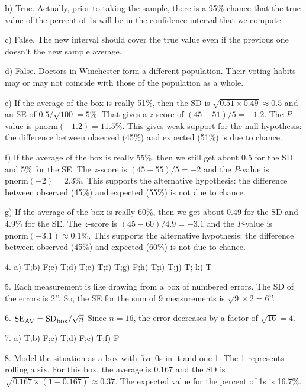 \documentclass[10pt]{article}
\newcommand{\Z}{\hphantom{0}}
\begin{document}
b) True. Actually, prior to taking the sample, there is a 95\% chance that the 
true value of the percent of 1s will be in the confidence interval that we compute.

c) False.  The new interval should cover the true value even if the previous one doesn't
the new sample average.

d) False.  Doctors in Winchester form a different population.  Their voting habits may or may not
coincide with those of the population as a whole.

e) If the average of the box is really 51\%, then the SD is $\sqrt{0.51\times 0.49}\approx 0.5$
and an SE of $0.5/\sqrt{100} = 5\%$.
That gives a $z$-score of $(45 - 51)/5 = -1.2$.  The $P$-value is $\mbox{pnorm}(-1.2)=11.5\%$.  This gives
weak support for the null hypothesis:  the difference between observed (45\%) and expected (51\%) is 
due to chance.

f) If the average of the box is really 55\%, then we still get about $0.5$ for the SD and 5\% for the SE.
The $z$-score is $(45-55)/5=-2$ and the $P$-value is $\mbox{pnorm}(-2)=2.3\%$.  This supports
the alternative hypothesis:  the difference between observed (45\%) and expected (55\%) is 
not due to chance.

g) If the average of the box is really 60\%, then we  get about $0.49$ for the SD and 4.9\% for the SE.
The $z$-score is $(45-60)/4.9=-3.1$ and the $P$-value is $\mbox{pnorm}(-3.1)\approx 0.1\%$.  This supports
the alternative hypothesis:  the difference between observed (45\%) and expected (60\%) is 
not due to chance.
\smallskip

\renewcommand{\Z}{\hspace{10pt}}
4. a) T;\Z b) F;\Z c) T;\Z d) T;\Z e) T;\Z f) T;\Z g) F;\Z h) T;\Z i) T;\Z j) T;\Z
k) T
\smallskip

5. Each measurement is like drawing from a box of numbered errors.  The SD of the errors is 2\rq\rq.
So, the SE for the sum of 9 measurements is $\sqrt{9}\times 2 = 6$\rq\rq.\vspace{2pt}


6. $\mbox{SE}_{\mbox{\footnotesize AV}} = \mbox{SD}_{\mbox{\footnotesize box}}/\sqrt{n}$  Since $n=16$, the 
error decreases by a factor of $\sqrt{16}=4$.\vspace{2pt}

7. a) T;\Z b)  F;\Z c) T;\Z d) F;\Z e) T;\Z f) F\vspace{2pt}

8. Model the situation as a box with five 0s in it and one 1. The 1 represents rolling a six.
For this box, the average is $0.167$ and the SD is $\sqrt{0.167\times (1- 0.167)}\approx 0.37$.
The expected value for the percent of 1s is 16.7\%.  
\end{document}
